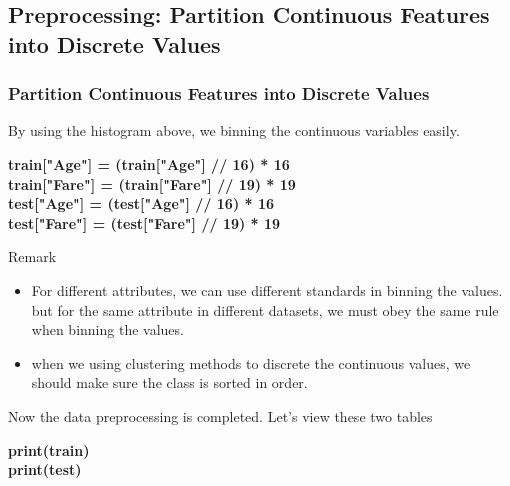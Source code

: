 \documentclass{beamer}
\begin{document}
\subsection{Preprocessing: Partition Continuous Features into Discrete Values}
\begin{frame}
	\frametitle{Partition Continuous Features into Discrete Values}
	\begin{flushleft}
		By using the histogram above, we binning the continuous variables easily.
	\end{flushleft}
	\begin{center}
		\textbf{\color{blue} \footnotesize
			train["Age"] = (train["Age"] // 16) * 16~~ \\
			train["Fare"] = (train["Fare"] // 19) * 19 \\
			test["Age"] = (test["Age"] // 16) * 16~~~~ \\
			test["Fare"] = (test["Fare"] // 19) * 19~~
		}
	\end{center}
	\begin{block}{Remark}
		\begin{itemize}
	  	\item For different attributes, we can use different standards in binning the values. but for the same attribute in different datasets, we must obey the same rule when binning the values. 
	  	\item when we using clustering methods to discrete the continuous values, we should make sure the class is sorted in order.
		\end{itemize}
	\end{block}
	\begin{flushleft}
		Now the data preprocessing is completed. Let's view these two tables
	\end{flushleft}
	\begin{center}
		\textbf{\color{blue} \footnotesize
			print(train) \\
			print(test)~
		}
	\end{center}
\end{frame}
\end{document}
